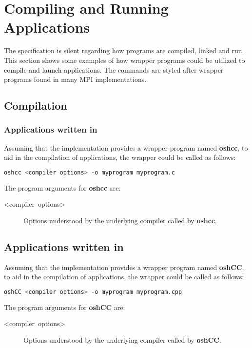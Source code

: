 
\section{Compiling and Running Applications}

The \openshmem specification is silent regarding how \openshmem programs
are compiled, linked and run. This section shows some examples of
how wrapper programs could be utilized to compile and launch applications.
The commands are styled after wrapper programs found in many MPI implementations.


\subsection{Compilation}


\subsubsection{Applications written in \Clang}

Assuming that the implementation provides a wrapper program named
\textbf{oshcc}, to aid in the compilation of \Clang{} applications, the wrapper
could be called as follows:

\begin{lstlisting}[language=bash]
oshcc <compiler options> -o myprogram myprogram.c
\end{lstlisting}


The program arguments for \textbf{oshcc} are:
\begin{description}
\item [{<compiler\ options>}] Options understood by the underlying \Clang{} compiler
called by \textbf{oshcc}.
\end{description}

\subsection{Applications written in \Cpp}

Assuming that the implementation provides a wrapper program named
\textbf{oshCC}, to aid in the compilation of \Cpp{} applications, the
wrapper could be called as follows:

\begin{lstlisting}[language=bash]
oshCC <compiler options> -o myprogram myprogram.cpp
\end{lstlisting}


The program arguments for \textbf{oshCC} are:
\begin{description}
\item [{<compiler\ options>}] Options understood by the underlying \Cpp{}
compiler called by \textbf{oshCC}.
\end{description}

